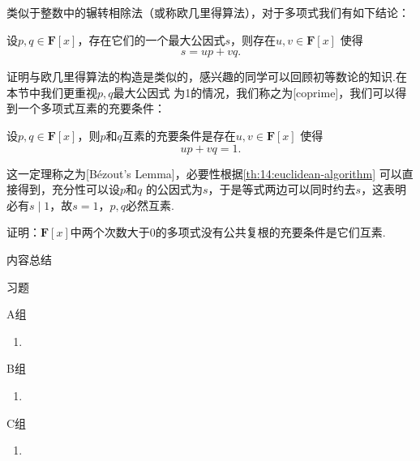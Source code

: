 类似于整数中的辗转相除法（或称欧几里得算法），对于多项式我们有如下结论：
\begin{theorem}\label{th:14:euclidean-algorithm}
    设$p,q\in\mathbf{F}[x]$，存在它们的一个最大公因式$s$，则存在$u,v\in\mathbf{F}[x]$
    使得\[s=up+vq.\]
\end{theorem}
证明与欧几里得算法的构造是类似的，感兴趣的同学可以回顾初等数论的知识.在本节中我们更重视$p,q$最大公因式
为1的情况，我们称之为[coprime]，我们可以得到一个多项式互素的充要条件：
\begin{theorem}\label{th:14:bezout-lemma}
    设$p,q\in\mathbf{F}[x]$，则$p$和$q$互素的充要条件是存在$u,v\in\mathbf{F}[x]$
    使得\[up+vq=1.\]
\end{theorem}
这一定理称之为[B\'ezout's Lemma]，必要性根据\autoref{th:14:euclidean-algorithm} 可以直接得到，充分性可以设$p$和$q$
的公因式为$s$，于是等式两边可以同时约去$s$，这表明必有$s \mid 1$，故$s=1$，$p,q$必然互素.
\begin{example}
    证明：$\mathbf{F}[x]$中两个次数大于$0$的多项式没有公共复根的充要条件是它们互素.
\end{example}

\vspace{2ex}
\centerline{\heiti \Large 内容总结}

\vspace{2ex}

\centerline{\heiti \Large 习题}
\vspace{2ex}
{\kaishu }
\begin{flushright}
    \kaishu

\end{flushright}
\centerline{\heiti A组}
\begin{enumerate}
    \item
\end{enumerate}
\centerline{\heiti B组}
\begin{enumerate}
    \item
\end{enumerate}
\centerline{\heiti C组}
\begin{enumerate}
    \item
\end{enumerate}
